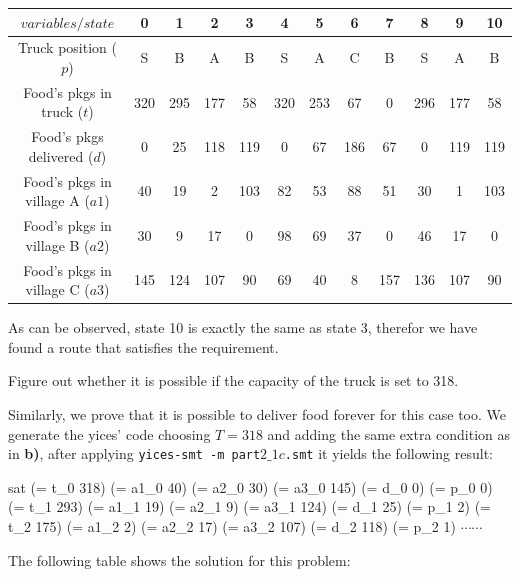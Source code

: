 \begin{description}

  \begin{center}
\begin{tabular}{|c|c|c|c|a|c|c|c|c|c|c|a|}
  \hline
  $variables/state$ & 0 & 1 & 2 & 3 & 4 & 5 & 6 & 7 & 8 & 9 & 10  \\
  \hline
  Truck position ($p$) & S & B & A & B & S & A & C & B & S & A & B\\
  Food's pkgs in truck ($t$) & 320 & 295 & 177 & 58 & 320 & 253 & 67 & 0 & 296 & 177 & 58\\
  Food's pkgs delivered ($d$) & 0 & 25 & 118 & 119 & 0 & 67 & 186 & 67 & 0 & 119 & 119\\
  Food's pkgs in village A ($a1$) & 40  & 19  & 2   & 103 & 82 & 53 & 88 & 51  & 30  & 1   & 103 \\
  Food's pkgs in village B ($a2$) & 30  & 9   & 17  & 0   & 98 & 69 & 37 & 0   & 46  & 17  & 0  \\
  Food's pkgs in village C ($a3$) & 145 & 124 & 107 & 90  & 69 & 40 & 8  & 157 & 136 & 107 & 90  \\
  \hline
\end{tabular}
\end{center}

  As can be observed, state 10 is exactly the same as state 3, therefor we have found a route that satisfies the requirement. 

  \item[(c)]  Figure out whether it is possible if the capacity of the truck is set to 318.

  Similarly, we prove that it is possible to deliver food forever for this case too. We generate the yices' code choosing $T = 318$ and adding the same extra condition as in \textbf{b)}, after applying {\tt yices-smt -m part$2\_1c$.smt} it yields the following result:
  
    \selectfont
  {\footnotesize
  \noindent

sat\break
(= t\_0 318)\break
(= a1\_0 40)\break
(= a2\_0 30)\break
(= a3\_0 145)\break
(= d\_0 0)\break
(= p\_0 0)\break
(= t\_1 293)\break
(= a1\_1 19)\break
(= a2\_1 9)\break
(= a3\_1 124)\break
(= d\_1 25)\break
(= p\_1 2)\break
(= t\_2 175)\break
(= a1\_2 2)\break
(= a2\_2 17)\break
(= a3\_2 107)\break
(= d\_2 118)\break
(= p\_2 1)\break
$\cdots \cdots$
  }
  \selectfont
  \vspace{3mm}
  
  The following table shows the solution for this problem:
  

\end{description}
